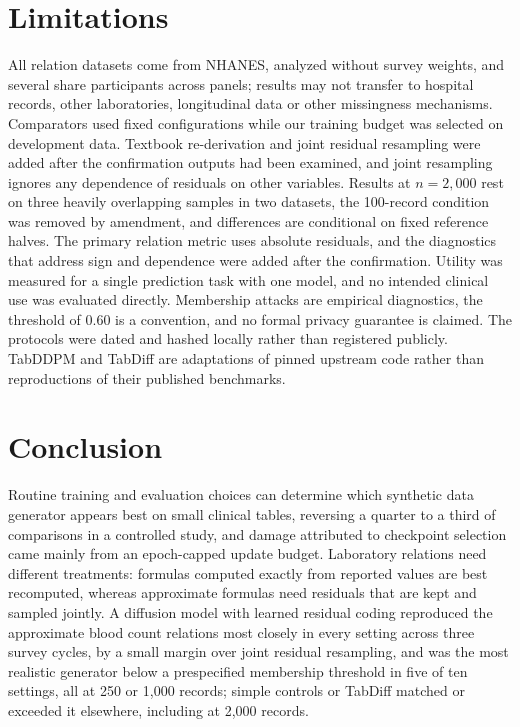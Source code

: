 \documentclass[conference]{IEEEtran}
\begin{document}
\section{Limitations}

All relation datasets come from NHANES, analyzed without survey weights, and several share participants across panels; results may not transfer to hospital records, other laboratories, longitudinal data or other missingness mechanisms. Comparators used fixed configurations while our training budget was selected on development data. Textbook re-derivation and joint residual resampling were added after the confirmation outputs had been examined, and joint resampling ignores any dependence of residuals on other variables. Results at $n = 2{,}000$ rest on three heavily overlapping samples in two datasets, the 100-record condition was removed by amendment, and differences are conditional on fixed reference halves. The primary relation metric uses absolute residuals, and the diagnostics that address sign and dependence were added after the confirmation. Utility was measured for a single prediction task with one model, and no intended clinical use was evaluated directly. Membership attacks are empirical diagnostics, the threshold of 0.60 is a convention, and no formal privacy guarantee is claimed. The protocols were dated and hashed locally rather than registered publicly. TabDDPM and TabDiff are adaptations of pinned upstream code rather than reproductions of their published benchmarks.

\section{Conclusion}

Routine training and evaluation choices can determine which synthetic data generator appears best on small clinical tables, reversing a quarter to a third of comparisons in a controlled study, and damage attributed to checkpoint selection came mainly from an epoch-capped update budget. Laboratory relations need different treatments: formulas computed exactly from reported values are best recomputed, whereas approximate formulas need residuals that are kept and sampled jointly. A diffusion model with learned residual coding reproduced the approximate blood count relations most closely in every setting across three survey cycles, by a small margin over joint residual resampling, and was the most realistic generator below a prespecified membership threshold in five of ten settings, all at 250 or 1,000 records; simple controls or TabDiff matched or exceeded it elsewhere, including at 2,000 records.
\end{document}
